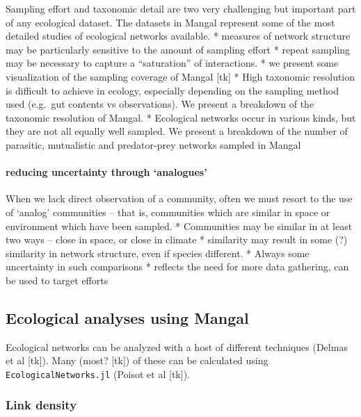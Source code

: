 Sampling effort and taxonomic detail are two very challenging but
important part of any ecological dataset. The datasets in Mangal
represent some of the most detailed studies of ecological networks
available. * measures of network structure may be particularly sensitive
to the amount of sampling effort * repeat sampling may be necessary to
capture a ``saturation'' of interactions. * we present some
visualization of the sampling coverage of Mangal {[}tk{]} * High
taxonomic resolution is difficult to achieve in ecology, especially
depending on the sampling method used (e.g.~gut contents vs
observations). We present a breakdown of the taxonomic resolution of
Mangal. * Ecological networks occur in various kinds, but they are not
all equally well sampled. We present a breakdown of the number of
parasitic, mutualistic and predator-prey networks sampled in Mangal

\hypertarget{reducing-uncertainty-through-analogues}{%
\paragraph{reducing uncertainty through
`analogues'}\label{reducing-uncertainty-through-analogues}}

When we lack direct observation of a community, often we must resort to
the use of `analog' communities -- that is, communities which are
similar in space or environment which have been sampled. * Communities
may be similar in at least two ways -- close in space, or close in
climate * similarity may result in some (?) similarity in network
structure, even if species different. * Always some uncertainty in such
comparisons * reflects the need for more data gathering, can be used to
target efforts

\hypertarget{ecological-analyses-using-mangal}{%
\subsection{Ecological analyses using
Mangal}\label{ecological-analyses-using-mangal}}

Ecological networks can be analyzed with a host of different techniques
(Delmas et al {[}tk{]}). Many (most? {[}tk{]}) of these can be
calculated using \texttt{EcologicalNetworks.jl} (Poisot et al {[}tk{]}).

\hypertarget{link-density}{%
\subsubsection{Link density}\label{link-density}}

